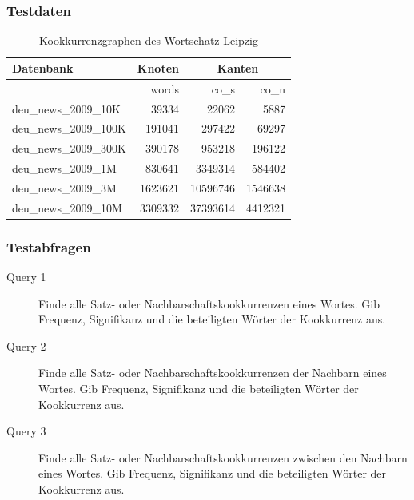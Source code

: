 \documentclass{beamer}
\begin{document}
\begin{frame}\frametitle{Testdaten}
	\begin{table}
	\begin{tabular}{|l|r|r|r|}
		\hline
		Datenbank & Knoten & \multicolumn{2}{|c|}{Kanten}\\
		\hline
		 & words & co\_{}s & co\_{}n \\
		\hline
		\hline
		deu\_{}news\_{}2009\_{}10K & 39334 & 22062 & 5887\\
		\hline
		deu\_{}news\_{}2009\_{}100K & 191041 & 297422 & 69297\\
		\hline
		deu\_{}news\_{}2009\_{}300K & 390178 & 953218 & 196122\\
		\hline
		deu\_{}news\_{}2009\_{}1M & 830641 & 3349314 & 584402\\
		\hline
		deu\_{}news\_{}2009\_{}3M & 1623621 & 10596746 & 1546638\\
		\hline
		deu\_{}news\_{}2009\_{}10M & 3309332 & 37393614 & 4412321\\
		\hline
	\end{tabular}
	\caption{Kookkurrenzgraphen des Wortschatz Leipzig}
	\end{table}
\end{frame}

\begin{frame}\frametitle{Testabfragen}
\begin{description}
\item[Query 1]Finde alle Satz- oder Nachbarschaftskookkurrenzen eines Wortes. Gib Frequenz, Signifikanz und die beteiligten Wörter der Kookkurrenz aus.
\item[Query 2]Finde alle Satz- oder Nachbarschaftskookkurrenzen der Nachbarn eines Wortes. Gib Frequenz, Signifikanz und die beteiligten Wörter der Kookkurrenz aus.
\item[Query 3]Finde alle Satz- oder Nachbarschaftskookkurrenzen zwischen den Nachbarn eines Wortes. Gib Frequenz, Signifikanz und die beteiligten Wörter der Kookkurrenz aus.
\end{description}
\end{frame}
\end{document}

